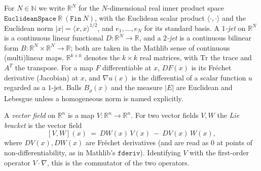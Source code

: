 \begin{definition}
For $N\in\mathbb N$ we write $\mathbb R^N$ for the $N$-dimensional real inner product
space $\texttt{EuclideanSpace}\ \mathbb R\ (\texttt{Fin}\ N)$, with the Euclidean scalar
product $\langle\cdot,\cdot\rangle$ and the Euclidean norm $|x|=\langle x,x\rangle^{1/2}$,
and $e_1,\ldots,e_N$ for its standard basis. A \emph{$1$-jet} on $\mathbb R^N$ is a
continuous linear functional $D:\mathbb R^N\to\mathbb R$, and a \emph{$2$-jet} is a
continuous bilinear form $B:\mathbb R^N\times\mathbb R^N\to\mathbb R$; both are taken in
the Mathlib sense of continuous (multi)linear maps. $\mathbb R^{k\times k}$ denotes the
$k\times k$ real matrices, with $\mathrm{Tr}$ the trace and $A^T$ the transpose. For a map
$F$ differentiable at $x$, $DF(x)$ is its Fr\'echet derivative (Jacobian) at $x$, and
$\nabla u(x)$ is the differential of a scalar function $u$ regarded as a $1$-jet.
Balls $B_\rho(x)$ and the measure $|E|$ are Euclidean and Lebesgue unless a homogeneous
norm is named explicitly.
\end{definition}

\begin{definition}
A \emph{vector field} on $\mathbb R^n$ is a map $V:\mathbb R^n\to\mathbb R^n$. For two
vector fields $V,W$ the \emph{Lie bracket} is the vector field
\[
 [V,W](x)\ =\ DW(x)\,V(x)\ -\ DV(x)\,W(x),
\]
where $DV(x),DW(x)$ are Fr\'echet derivatives (and are read as $0$ at points of
non-differentiability, as in Mathlib's $\texttt{fderiv}$). Identifying $V$ with the
first-order operator $V\cdot\nabla$, this is the commutator of the two operators.
\end{definition}
